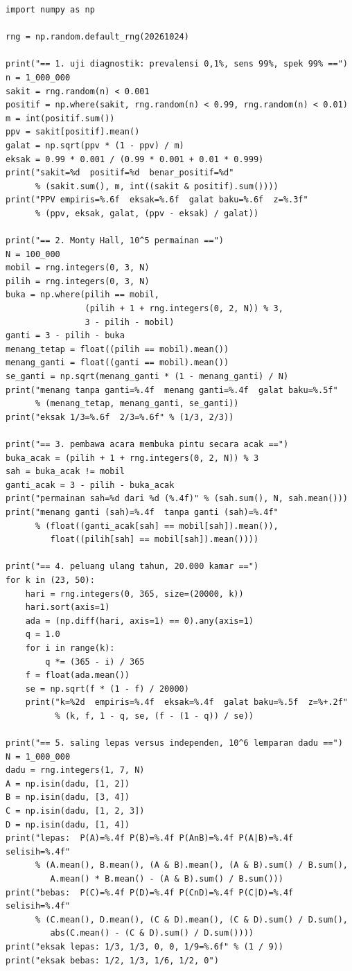 \begin{lab}
    \begin{verbatim}
import numpy as np

rng = np.random.default_rng(20261024)

print("== 1. uji diagnostik: prevalensi 0,1%, sens 99%, spek 99% ==")
n = 1_000_000
sakit = rng.random(n) < 0.001
positif = np.where(sakit, rng.random(n) < 0.99, rng.random(n) < 0.01)
m = int(positif.sum())
ppv = sakit[positif].mean()
galat = np.sqrt(ppv * (1 - ppv) / m)
eksak = 0.99 * 0.001 / (0.99 * 0.001 + 0.01 * 0.999)
print("sakit=%d  positif=%d  benar_positif=%d"
      % (sakit.sum(), m, int((sakit & positif).sum())))
print("PPV empiris=%.6f  eksak=%.6f  galat baku=%.6f  z=%.3f"
      % (ppv, eksak, galat, (ppv - eksak) / galat))

print("== 2. Monty Hall, 10^5 permainan ==")
N = 100_000
mobil = rng.integers(0, 3, N)
pilih = rng.integers(0, 3, N)
buka = np.where(pilih == mobil,
                (pilih + 1 + rng.integers(0, 2, N)) % 3,
                3 - pilih - mobil)
ganti = 3 - pilih - buka
menang_tetap = float((pilih == mobil).mean())
menang_ganti = float((ganti == mobil).mean())
se_ganti = np.sqrt(menang_ganti * (1 - menang_ganti) / N)
print("menang tanpa ganti=%.4f  menang ganti=%.4f  galat baku=%.5f"
      % (menang_tetap, menang_ganti, se_ganti))
print("eksak 1/3=%.6f  2/3=%.6f" % (1/3, 2/3))

print("== 3. pembawa acara membuka pintu secara acak ==")
buka_acak = (pilih + 1 + rng.integers(0, 2, N)) % 3
sah = buka_acak != mobil
ganti_acak = 3 - pilih - buka_acak
print("permainan sah=%d dari %d (%.4f)" % (sah.sum(), N, sah.mean()))
print("menang ganti (sah)=%.4f  tanpa ganti (sah)=%.4f"
      % (float((ganti_acak[sah] == mobil[sah]).mean()),
         float((pilih[sah] == mobil[sah]).mean())))

print("== 4. peluang ulang tahun, 20.000 kamar ==")
for k in (23, 50):
    hari = rng.integers(0, 365, size=(20000, k))
    hari.sort(axis=1)
    ada = (np.diff(hari, axis=1) == 0).any(axis=1)
    q = 1.0
    for i in range(k):
        q *= (365 - i) / 365
    f = float(ada.mean())
    se = np.sqrt(f * (1 - f) / 20000)
    print("k=%2d  empiris=%.4f  eksak=%.4f  galat baku=%.5f  z=%+.2f"
          % (k, f, 1 - q, se, (f - (1 - q)) / se))

print("== 5. saling lepas versus independen, 10^6 lemparan dadu ==")
N = 1_000_000
dadu = rng.integers(1, 7, N)
A = np.isin(dadu, [1, 2])
B = np.isin(dadu, [3, 4])
C = np.isin(dadu, [1, 2, 3])
D = np.isin(dadu, [1, 4])
print("lepas:  P(A)=%.4f P(B)=%.4f P(AnB)=%.4f P(A|B)=%.4f selisih=%.4f"
      % (A.mean(), B.mean(), (A & B).mean(), (A & B).sum() / B.sum(),
         A.mean() * B.mean() - (A & B).sum() / B.sum()))
print("bebas:  P(C)=%.4f P(D)=%.4f P(CnD)=%.4f P(C|D)=%.4f selisih=%.4f"
      % (C.mean(), D.mean(), (C & D).mean(), (C & D).sum() / D.sum(),
         abs(C.mean() - (C & D).sum() / D.sum())))
print("eksak lepas: 1/3, 1/3, 0, 0, 1/9=%.6f" % (1 / 9))
print("eksak bebas: 1/2, 1/3, 1/6, 1/2, 0")
\end{verbatim}    
\end{lab}

